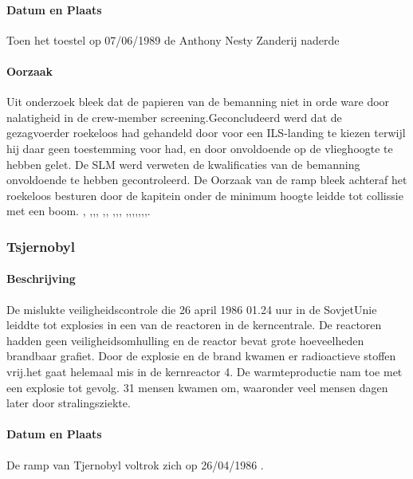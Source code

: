 \documentclass{article}
\begin{document}
	\paragraph{Datum en Plaats}
 	Toen het toestel op 07/06/1989 de Anthony Nesty Zanderij naderde
	\paragraph{Oorzaak}
	\newline \indent

	Uit onderzoek bleek dat de papieren van de bemanning niet in orde ware door nalatigheid in de crew-member screening.Geconcludeerd werd dat de gezagvoerder roekeloos had gehandeld door voor een ILS-landing te kiezen terwijl hij daar geen toestemming voor had, en door onvoldoende op de vlieghoogte te hebben gelet. 
	De SLM werd verweten de kwalificaties van de bemanning onvoldoende te hebben gecontroleerd. De Oorzaak van de ramp bleek achteraf het roekeloos besturen door de kapitein onder de minimum hoogte leidde tot collissie met een boom.
	\cite{espnSLMterugblik},\cite{dennisRosier01052020}
	\cite{hassing07062020slmramp},\cite{amsterdamArchiefSLM},\cite{rtvOost06062019nabestaande},
	\cite{breda07062021AndroSnel},\cite{andereTijdenSLMCrash},
	\cite{aviationReport},\cite{aviationSLMCrashAccidentInvestigation},\cite{mcDonnelDouglasCommissionReportSLMCrash},
	\cite{wikiSRFlight764},\cite{nos07062019SLMTerugblik},\cite{dagvantoenSLMCrash},\cite{waterkantNesty07061989},\cite{eduNandlalSRCrash},\cite{oldjetsSRAirways},\cite{cloudberg02012021srflight764},\cite{apnews07061989srplanecrash}.
	\subsubsection{Tsjernobyl}
	\paragraph{Beschrijving}
		De mislukte veiligheidscontrole die 26 april 1986 01.24 uur in de SovjetUnie leiddte tot explosies in een van de reactoren in de kerncentrale. De reactoren hadden geen veiligheidsomhulling en de reactor bevat grote hoeveelheden brandbaar grafiet. Door de explosie en de brand kwamen er radioactieve stoffen vrij.het gaat helemaal mis in de kernreactor 4. De warmteproductie nam  toe met een explosie tot gevolg. 31 mensen kwamen om, waaronder veel mensen dagen later door stralingsziekte.
	\paragraph{Datum en Plaats}
		 De ramp van Tjernobyl voltrok zich op 26/04/1986 \cite{INSAVienna1992Chernobyl}.
\end{document}
